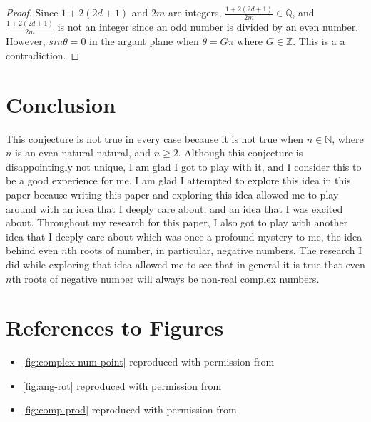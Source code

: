 \documentclass{turabian-researchpaper}
\begin{document}
\begin{proof}
     Since \(1 + 2(2d + 1)\) and \(2m\) are integers, \(\frac{1 + 2(2d + 1)}{2m} \in \mathds{Q}\), and \(\frac{1 + 2(2d + 1)}{2m}\) is not an integer since an odd number is divided by an even number. However, \(sin\theta = 0\) in the argant plane when \(\theta = G\pi\) where \(G \in \mathds{Z}\). This is a a contradiction. 
\end{proof} 

\section{Conclusion} 

This conjecture is not true in every case because it is not true when \(n \in \mathds{N}\), where \(n\) is an even natural natural, and \(n \geq 2\).  Although this conjecture is disappointingly not unique, I am glad I got to play with it, and I consider this to be a good experience for me. I am glad I attempted to explore this idea in this paper because writing this paper and exploring this idea allowed me to play around with an idea that I deeply care about, and an idea that I was excited about. Throughout my research for this paper, I also got to play with another idea that I deeply care about which was once a profound mystery to me, the idea behind even \(n\)th roots of number, in particular, negative numbers. The research I did while exploring that idea allowed me to see that in general it is true that even \(n\)th roots of negative number will always be non-real complex numbers. 

\newpage




\section*{References to Figures} 

\begin{itemize}
    \item \cref{fig:complex-num-point} reproduced with permission from \cite{highermath2024} 
    \item \cref{fig:ang-rot} reproduced with permission from \cite{byju's2024} 
    \item \cref{fig:comp-prod} reproduced with permission from \cite{byju's2024prod}
\end{itemize} 
\end{document}
